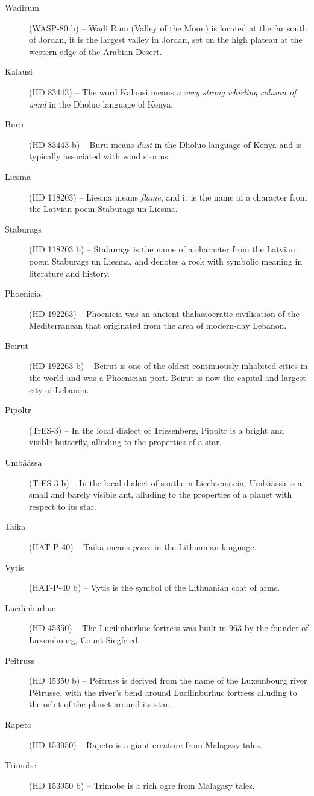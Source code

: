 \begin{description}
\item[Wadirum] (WASP-80 b) -- Wadi Rum (Valley of the Moon) is located at the far south of Jordan, it is the largest valley in Jordan, set on the high plateau at the western edge of the Arabian Desert.
\item[Kalausi] (HD 83443) -- The word Kalausi means \textit{a very strong whirling column of wind} in the Dholuo language of Kenya.
\item[Buru] (HD 83443 b) -- Buru means \textit{dust} in the Dholuo language of Kenya and is typically associated with wind storms.
\item[Liesma] (HD 118203) -- Liesma means \textit{flame}, and it is the name of a character from the Latvian poem Staburags un Liesma.
\item[Staburags] (HD 118203 b) -- Staburags is the name of a character from the Latvian poem Staburags un Liesma, and denotes a rock with symbolic meaning in literature and history.
\item[Phoenicia] (HD 192263) -- Phoenicia was an ancient thalassocratic civilisation of the Mediterranean that originated from the area of modern-day Lebanon.
\item[Beirut] (HD 192263 b) -- Beirut is one of the oldest continuously inhabited cities in the world and was a Phoenician port. Beirut is now the capital and largest city of Lebanon.
\item[Pipoltr] (TrES-3) -- In the local dialect of Triesenberg, Pipoltr is a bright and visible butterfly, alluding to the properties of a star.
\item[Umbäässa] (TrES-3 b) -- In the local dialect of southern Liechtenstein, Umbäässa is a small and barely visible ant, alluding to the properties of a planet with respect to its star.
\item[Taika] (HAT-P-40) -- Taika means \textit{peace} in the Lithuanian language.
\item[Vytis] (HAT-P-40 b) -- Vytis is the symbol of the Lithuanian coat of arms.
\item[Lucilinburhuc] (HD 45350) -- The Lucilinburhuc fortress was built in 963 by the founder of Luxembourg, Count Siegfried.
\item[Peitruss] (HD 45350 b) -- Peitruss is derived from the name of the Luxembourg river Pétrusse, with the river's bend around Lucilinburhuc fortress alluding to the orbit of the planet around its star.
\item[Rapeto] (HD 153950) -- Rapeto is a giant creature from Malagasy tales.
\item[Trimobe] (HD 153950 b) -- Trimobe is a rich ogre from Malagasy tales.

\end{description}
